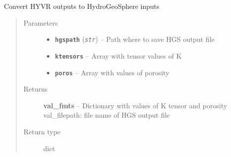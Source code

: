 \documentclass[letterpaper,10pt,english]{sphinxmanual}
\begin{document}
\begin{fulllineitems}
\label{hyvr:hyvr.hyvr.utils.to_hgs}
Convert HYVR outputs to HydroGeoSphere inputs
\begin{quote}\begin{description}
\item[{Parameters}] \leavevmode\begin{itemize}
\item {} 
\textbf{\texttt{hgspath}} (\emph{\texttt{str}}) -- Path where to save HGS output file

\item {} 
\textbf{\texttt{ktensors}} -- Array with tensor values of K

\item {} 
\textbf{\texttt{poros}} -- Array with values of porosity

\end{itemize}

\item[{Returns}] \leavevmode
\textbf{val\_fmts} -- Dictionary with values of K tensor and porosity
val\_filepath:           file name of HGS output file

\item[{Return type}] \leavevmode
dict

\end{description}\end{quote}

\end{fulllineitems}

\end{document}
